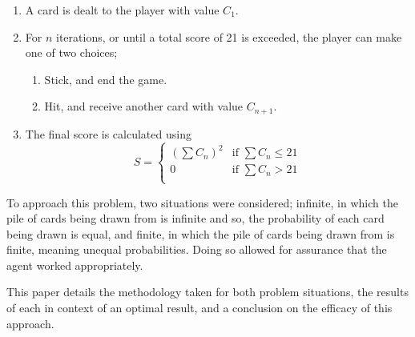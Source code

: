 \begin{enumerate}
    \item A card is dealt to the player with value \(C_1\).
    \item For \(n\) iterations, or until a total score of 21 is exceeded, the player can make one of two choices;
    \begin{enumerate} 
        \item Stick, and end the game.
        \item Hit, and receive another card with value \(C_{n+1}\).
    \end{enumerate}
    \item The final score is calculated using
        \begin{equation}
            S = 
            \begin{cases}
                (\sum C_n)^2 & \text{if } \sum C_n \le 21\\
                0            & \text{if } \sum C_n >   21\\
            \end{cases}
        \end{equation}
\end{enumerate}

To approach this problem, two situations were considered; infinite, in which the pile of cards being drawn from is infinite and so, the probability of each card being drawn is equal, and finite, in which the pile of cards being drawn from is finite, meaning unequal probabilities. Doing so allowed for assurance that the agent worked appropriately. 

This paper details the methodology taken for both problem situations, the results of each in context of an optimal result, and a conclusion on the efficacy of this approach.

